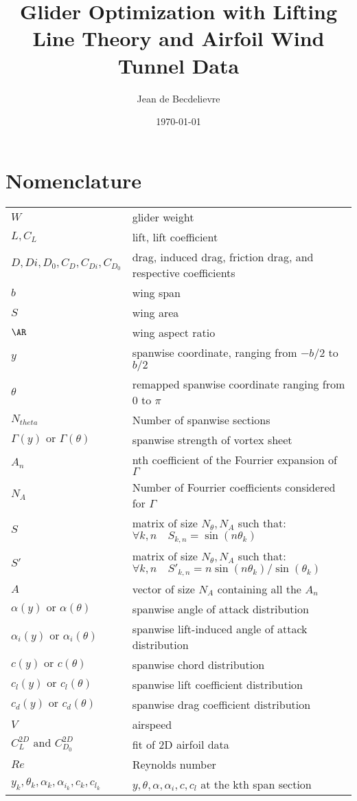 \documentclass[letterpaper,12pt]{article}
\begin{document}
\title{Glider Optimization with Lifting Line Theory and Airfoil Wind Tunnel Data}
\author{Jean de Becdelievre}
\date{\today}
\maketitle

\section{Nomenclature}

{\renewcommand\arraystretch{1.0}
\noindent\begin{longtable}{@{}l @{\quad : \quad} l@{}}
$W$  & glider weight \\
$L, C_L$ & lift, lift coefficient \\
$D,Di,D_0, C_D,C_{Di},C_{D_0}$& drag, induced drag, friction drag, and respective coefficients \\
$b$ & wing span \\
$S$ & wing area \\
$\AR$ & wing aspect ratio \\
$y$ & spanwise coordinate, ranging from $-b/2$ to $b/2$ \\
$\theta$ & remapped spanwise coordinate ranging from $0$ to $\pi$ \\
$N_{theta}$ & Number of spanwise sections \\
$\Gamma(y) \text{ or } \Gamma(\theta)$ & spanwise strength of vortex sheet\\
$A_n$ & nth coefficient of the Fourrier expansion of $\Gamma$ \\
$N_{A}$ & Number of Fourrier coefficients considered for $\Gamma$ \\
$S$ & matrix of size $N_{\theta}, N_A$ such that: $ \forall k,n \quad S_{k,n} = \sin(n\theta_k)$ \\
$S'$ & matrix of size $N_{\theta}, N_A$ such that: $ \forall k,n \quad {S'}_{k,n} = n\sin(n\theta_k)/\sin(\theta_k)$ \\
$A$ & vector of size $N_A$ containing all the $A_n$ \\
$\alpha(y) \text{ or } \alpha(\theta)$ & spanwise angle of attack distribution\\
$\alpha_i(y) \text{ or } \alpha_i(\theta)$ & spanwise lift-induced angle of attack distribution\\
$c(y) \text{ or } c(\theta)$ & spanwise chord distribution\\
$c_l(y) \text{ or } c_l(\theta)$ & spanwise lift coefficient distribution\\
$c_d(y) \text{ or } c_d(\theta)$ & spanwise drag coefficient distribution\\
$V$ & airspeed \\
$C_L^{2D} \text{ and } C_{D_0}^{2D}$ & fit of 2D airfoil data \\
$Re$ & Reynolds number \\
$y_k, \theta_k, \alpha_k, \alpha_{i_k}, c_k, c_{l_k}$ &  $y, \theta, \alpha, \alpha_i, c, c_{l}$ at the kth span section\\
\end{longtable}}
\end{document}

